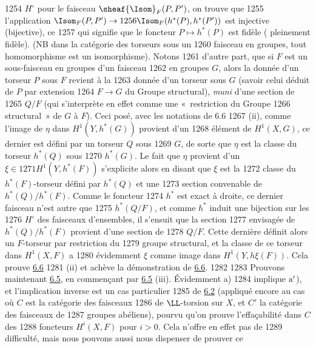   1254	$H^{\circ}$ pour le faisceau $\sheaf{\Isom}_F(P,P')$, on trouve que
  1255	l'application $\Isom_F(P,P')\rightarrow
  1256	\Isom_F(h^{\ast}(P),h^{\ast}(P'))$ est injective (\resp bijective), ce
  1257	qui signifie que le foncteur $P\mapsto h^{\ast}(P)$ est	fidèle (	pleinement fidèle). (NB dans la catégorie des torseurs sous un
  1260	faisceau en groupes, tout homomorphisme est un isomorphisme). Notons
  1261	d'autre part, que si $F$ est un sous-faisceau en groupes d'un faisceau
  1262	en groupes $G$, alors la donnée d'un torseur $P$ sous $F$ revient à la
  1263	donnée d'un torseur sous $G$ (savoir celui déduit de $P$ par extension
  1264	$F\rightarrow G$ du Groupe structural), \emph{muni} d'une section de
  1265	$Q/F$ (qui s'interprète en effet comme une « restriction du Groupe
  1266	structural »  de $G$ à $F$). Ceci posé, avec les notations de 6.6
  1267	(ii), comme l'image de $\eta$ dans $H^1(Y,h^{\ast}(G))$ provient d'un
  1268	élément de $H^1(X,G)$, ce dernier est défini par un torseur $Q$ sous
  1269	$G$, de sorte que $\eta$ est la classe du torseur $h^{\ast}(Q)$ sous
  1270	$h^{\ast}(G)$. Le fait que $\eta$ provient d'un $\xi\in
  1271	H^1(Y,h^{\ast}(F))$ s'explicite alors en disant que $\xi$ est la
  1272	classe du $h^{\ast}(F)$-torseur défini par $h^{\ast}(Q)$ et une
  1273	section convenable de $h^{\ast}(Q)/h^{\ast}(F)$. Comme le foncteur
  1274	$h^{\ast}$ est exact à droite, ce dernier faisceau n'est autre que
  1275	$h^{\ast}(Q/F)$, et comme $h^{\ast}$ induit une bijection sur les
  1276	$H^{\circ}$ des faisceaux d'ensembles, il s'ensuit que la section
  1277	envisagée de $h^{\ast}(Q)/h^{\ast}(F)$ provient d'une section de
  1278	$Q/F$. Cette dernière définit alors un $F$-torseur par restriction du
  1279	groupe structural, et la classe de ce torseur dans $H^1(X,F)$ a
  1280	évidemment $\xi$ comme image dans $H^1(Y,h\xi (F))$. Cela prouve \hyperref[XII.cor6.6]{6.6}
  1281	(ii) et achève la démonstration de \hyperref[XII.cor6.6]{6.6}.
  1282	
  1283	Prouvons maintenant \hyperref[XII.prop6.5]{6.5}, en commençant par \hyperref[XII.prop6.5]{6.5} (iii). Évidemment a)
  1284	implique ${\rm a'}$), et l'implication inverse est un cas particulier
  1285	de \hyperref[XII.lem6.2]{6.2} (appliqué encore au cas où $C$ est la catégorie des faisceaux
  1286	de $\LL$-torsion sur $X$, et $C'$ la catégorie des faisceaux de
  1287	groupes abéliens), pourvu qu'on prouve l'effaçabilité dans $C$ des
  1288	foncteurs $H^{i}(X,F)$ pour $i>0$. Cela n'offre en effet pas de
  1289	difficulté, mais nous pouvons aussi nous dispenser de prouver ce
